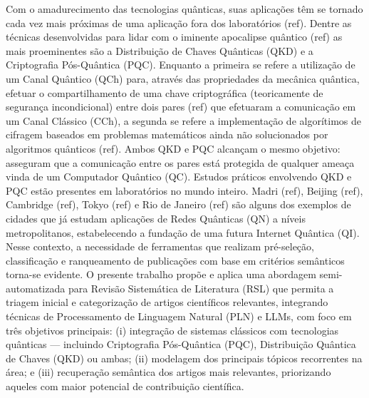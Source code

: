 \documentclass{siintec}
\begin{document}

Com o amadurecimento das tecnologias quânticas, suas aplicações têm se tornado cada vez mais próximas de uma aplicação fora dos laboratórios (ref). Dentre as técnicas desenvolvidas para lidar com o iminente apocalipse quântico (ref) as mais proeminentes são a Distribuição de Chaves Quânticas (QKD) e a Criptografia Pós-Quântica (PQC).
Enquanto a primeira se refere a utilização de um Canal Quântico (QCh) para, através das propriedades da mecânica quântica, efetuar o compartilhamento de uma chave criptográfica (teoricamente de segurança incondicional) entre dois pares (ref) que efetuaram a comunicação em um Canal Clássico (CCh), a segunda se refere a implementação de algorítimos de cifragem baseados em problemas matemáticos ainda não solucionados por algoritmos quânticos (ref). Ambos QKD e PQC alcançam o mesmo objetivo: asseguram que a comunicação entre os pares está protegida de qualquer ameaça vinda de um Computador Quântico (QC).
Estudos práticos envolvendo QKD e PQC estão presentes em laboratórios no mundo inteiro. Madri (ref), Beijing (ref), Cambridge (ref), Tokyo (ref) e Rio de Janeiro (ref) são alguns dos exemplos de cidades que já estudam 
aplicações de Redes Quânticas (QN) a níveis metropolitanos, estabelecendo a fundação de uma futura Internet Quântica (QI).
Nesse contexto, a necessidade de ferramentas que realizam pré-seleção, classificação e ranqueamento de publicações com base em critérios semânticos torna-se evidente. O presente trabalho propõe e aplica uma abordagem semi-automatizada para Revisão Sistemática de Literatura (RSL) que permita a triagem inicial e categorização de artigos científicos relevantes, integrando técnicas de Processamento de Linguagem Natural (PLN) e LLMs, com foco em três objetivos principais: (i) integração de sistemas clássicos com tecnologias quânticas — incluindo Criptografia Pós-Quântica (PQC), Distribuição Quântica de Chaves (QKD) ou ambas; (ii) modelagem dos principais tópicos recorrentes na área; e (iii) recuperação semântica dos artigos mais relevantes, priorizando aqueles com maior potencial de contribuição científica.
\end{document}
